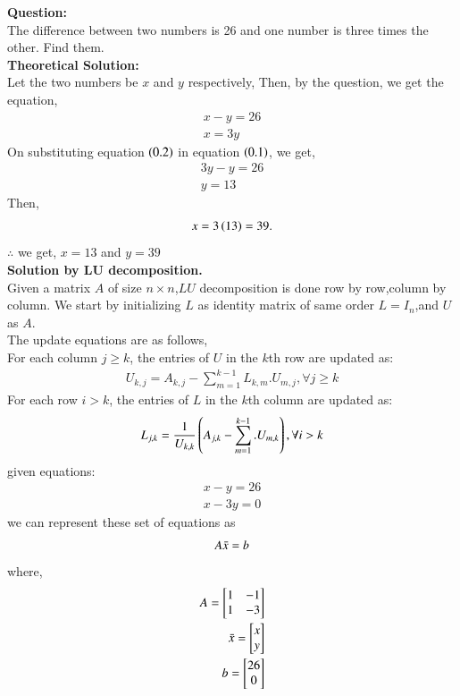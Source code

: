 \documentclass[journal]{IEEEtran}
\begin{document}
\textbf{Question:}
\\
The difference between two numbers is 26 and one number is three times the other. Find them.
\\
\textbf{ Theoretical Solution: }
\\
Let the two numbers be $x$ and $y$ respectively,
Then, by the question, we get the equation,
\begin{align} 
x - y = 26\\
x = 3y
\end{align}
On substituting equation $\left(0.2\right)$ in equation $\left(0.1\right)$, we get,
\begin{align}
    3y - y = 26\\
    y = 13
\end{align}
Then,
\begin{align}
    x = 3\left(13\right) = 39.
\end{align}
$\therefore$ we get, $x = 13$ and $y = 39$
\\
\textbf{Solution by LU decomposition.}
\\
Given a matrix $A$ of size $n\times n$,$LU$ decomposition is done row by row,column by column.
We start by initializing $L$ as identity matrix of same order $L = I_n$,and $U$ as $A$.\\
The update equations are as follows,\\
For each column $j \geq k$, the entries of $U$ in the $k$th row are updated as:
\begin{align}
    U_{k,j} = A_{k,j} - \sum_{m=1}^{k-1} L_{k,m}.U_{m,j},   \forall{j \geq k}
\end{align}
For each row $i > k$, the entries of $L$ in the $k$th column are updated as:
\begin{align}
    L_{j,k} = \frac{1}{U_{k,k}}\left(A_{j,k} - \sum_{m=1}^{k-1}.U_{m,k}\right), \forall{i>k}
\end{align}
 given equations:
 \begin{align}
     x - y = 26\\
     x - 3y = 0
 \end{align}
 we can represent these set of equations as
 \begin{align}
     A\Bar{x} = b
 \end{align}
 where,
 \begin{align}
     A = \begin{bmatrix}
         1 & -1\\
         1 & -3
     \end{bmatrix} \\
     \Bar{x} = \begin{bmatrix}
         x\\
         y
     \end{bmatrix} \\
     b = \begin{bmatrix}
         26\\
         0
     \end{bmatrix}
 \end{align}
\end{document}
